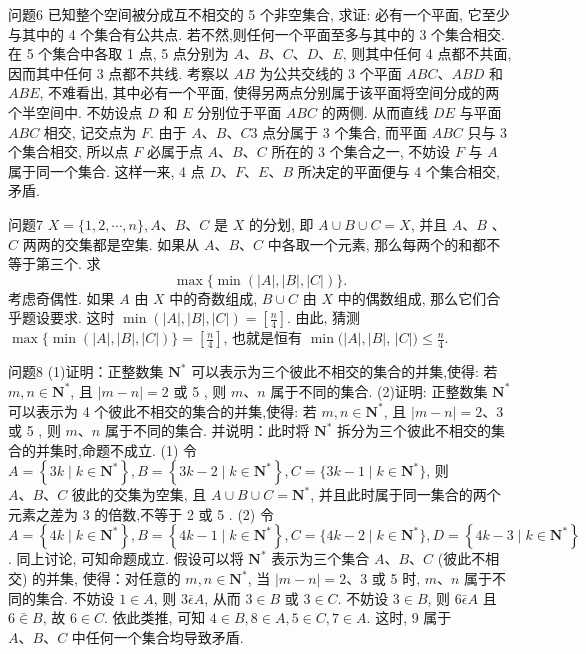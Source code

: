 问题6 已知整个空间被分成互不相交的 5 个非空集合, 求证: 必有一个平面, 它至少与其中的 4 个集合有公共点.
若不然,则任何一个平面至多与其中的 3 个集合相交.
在 5 个集合中各取 1 点, 5 点分别为 $A 、 B 、 C 、 D 、 E$, 则其中任何 4 点都不共面, 因而其中任何 3 点都不共线.
考察以 $A B$ 为公共交线的 3 个平面 $A B C 、 A B D$ 和 $A B E$, 不难看出, 其中必有一个平面, 使得另两点分别属于该平面将空间分成的两个半空间中.
不妨设点 $D$ 和 $E$ 分别位于平面 $A B C$ 的两侧.
从而直线 $D E$ 与平面 $A B C$ 相交, 记交点为 $F$. 由于 $A 、 B 、 C 3$ 点分属于 3 个集合, 而平面 $A B C$ 只与 3 个集合相交, 所以点 $F$ 必属于点 $A 、 B 、 C$ 所在的 3 个集合之一, 不妨设 $F$ 与 $A$ 属于同一个集合.
这样一来, 4 点 $D 、 F 、 E 、 B$ 所决定的平面便与 4 个集合相交,矛盾.



问题7 $X=\{1,2, \cdots, n\}, A 、 B 、 C$ 是 $X$ 的分划, 即 $A \cup B \cup C=X$, 并且 $A 、 B$ 、 $C$ 两两的交集都是空集.
如果从 $A 、 B 、 C$ 中各取一个元素, 那么每两个的和都不等于第三个.
求
$$
\max \{\min (|A|,|B|,|C|)\} .
$$
考虑奇偶性.
如果 $A$ 由 $X$ 中的奇数组成, $B \cup C$ 由 $X$ 中的偶数组成, 那么它们合乎题设要求.
这时 $\min (|A|,|B|,|C|)=\left[\frac{n}{4}\right]$. 由此, 猜测 $\max \{\min (|A|,|B|,|C|)\}=\left[\frac{n}{4}\right]$, 也就是恒有 $\min (|A|,|B|$, $|C|) \leqslant \frac{n}{4}$.



问题8 (1)证明：正整数集 $\mathbf{N}^*$ 可以表示为三个彼此不相交的集合的并集,使得: 若 $m, n \in \mathbf{N}^*$, 且 $|m-n|=2$ 或 5 , 则 $m 、 n$ 属于不同的集合.
(2)证明: 正整数集 $\mathbf{N}^*$ 可以表示为 4 个彼此不相交的集合的并集,使得: 若 $m, n \in \mathbf{N}^*$, 且 $|m-n|=2 、 3$ 或 5 , 则 $m 、 n$ 属于不同的集合.
并说明：此时将 $\mathbf{N}^*$ 拆分为三个彼此不相交的集合的并集时,命题不成立.
(1) 令 $A=\left\{3 k \mid k \in \mathbf{N}^*\right\}, B=\left\{3 k-2 \mid k \in \mathbf{N}^*\right\}, C=\{3 k- 1 \mid k \in \mathbf{N}^*\}$, 则 $A 、 B 、 C$ 彼此的交集为空集, 且 $A \cup B \cup C=\mathbf{N}^*$, 并且此时属于同一集合的两个元素之差为 3 的倍数,不等于 2 或 5 .
(2) 令 $A=\left\{4 k \mid k \in \mathbf{N}^*\right\}, B=\left\{4 k-1 \mid k \in \mathbf{N}^*\right\}, C=\{4 k-2 \mid k \in \mathbf{N}^*\}, D=\left\{4 k-3 \mid k \in \mathbf{N}^*\right\}$. 同上讨论, 可知命题成立.
假设可以将 $\mathbf{N}^*$ 表示为三个集合 $A 、 B 、 C$ (彼此不相交) 的并集, 使得：对任意的 $m, n \in \mathbf{N}^*$, 当 $|m-n|=2 、 3$ 或 5 时, $m 、 n$ 属于不同的集合.
不妨设 $1 \in A$, 则 $3 \bar{\epsilon} A$, 从而 $3 \in B$ 或 $3 \in C$. 不妨设 $3 \in B$, 则 $6 \bar{\epsilon} A$ 且 $6 \bar{\in} B$, 故 $6 \in C$. 依此类推, 可知 $4 \in B, 8 \in A, 5 \in C, 7 \in A$. 这时, 9 属于 $A 、 B 、 C$ 中任何一个集合均导致矛盾.



